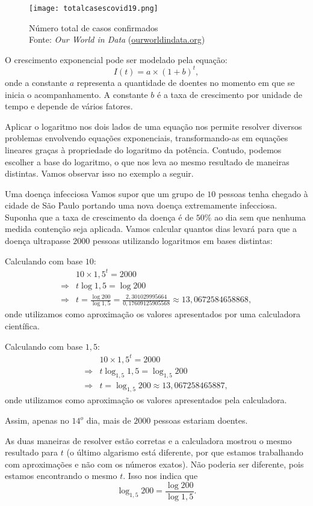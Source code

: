 \begin{figure}[H]
\centering
\texttt{[image: totalcasescovid19.png]}

\caption{Número total de casos confirmados \\ Fonte: \textit{Our World in Data} (\url{ourworldindata.org})}
\end{figure}

O crescimento exponencial pode ser modelado pela equação:
$$
I(t) = a\times (1+b)^t,
$$
onde a constante $a$ representa a quantidade de doentes no momento em que se inicia o acompanhamento. A constante $b$ é a taxa de crescimento por unidade de tempo e depende de vários fatores.

Aplicar o logaritmo nos dois lados de uma equação nos permite resolver diversos problemas envolvendo equações exponenciais, transformando-as em equações lineares graças à propriedade do logaritmo da potência. Contudo, podemos escolher a base do logaritmo, o que nos leva ao mesmo resultado de maneiras distintas. Vamos observar isso no exemplo a seguir.

\begin{example}{Uma doença infecciosa}
Vamos supor que um grupo de $10$ pessoas tenha chegado à cidade de São Paulo portando uma nova doença extremamente infecciosa. Suponha que a taxa de crescimento da doença é de $50\%$ ao dia sem que nenhuma medida contenção seja aplicada. Vamos calcular quantos dias levará para que a doença ultrapasse $2000$ pessoas utilizando logaritmos em bases distintas:

Calculando com base $10$:
\begin{align*} &10 \times 1{,}5^t = 2000\\
\Longrightarrow& t\log 1{,}5 = \log 200\\
\Longrightarrow& t = \frac{\log 200}{\log 1{,}5} = \frac{2{,}301029995664}{0{,}17609125905568} \approx 13{,}0672584658868,
\end{align*}
onde utilizamos como aproximação os valores apresentados por uma calculadora científica.

Calculando com base $1,5$:
\begin{align*} &10 \times 1{,}5^t = 2000\\
\Longrightarrow& t\log_{1{,}5} 1{,}5 = \log_{1{,}5} 200\\
\Longrightarrow& t = \log_{1{,}5} 200 \approx 13{,}067258465887,
\end{align*}
onde utilizamos como aproximação os valores apresentados pela calculadora.

Assim, apenas no $14^o$ dia, mais de $2000$ pessoas estariam doentes. 

As duas maneiras de resolver estão corretas e a calculadora mostrou o mesmo resultado para $t$ (o último algarismo está diferente, por que estamos trabalhando com aproximações e não com os números exatos). Não poderia ser diferente, pois estamos encontrando o mesmo $t$. Isso nos indica que
$$
\log_{1{,}5} 200 = \frac{\log 200}{\log 1{,}5}.
$$
\end{example}



